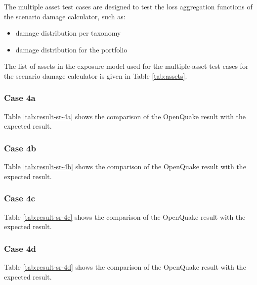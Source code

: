 The multiple asset test cases are designed to test the loss aggregation functions of the scenario damage calculator, such as:

\begin{itemize}
\item damage distribution per taxonomy
\item damage distribution for the portfolio
\end{itemize}

The list of assets in the exposure model used for the multiple-asset test cases for the scenario damage calculator is given in Table \ref{tab:assets}.



\subsubsection{Case 4a}


Table \ref{tab:result-sr-4a} shows the comparison of the OpenQuake result with the expected result.

\subsubsection{Case 4b}


Table \ref{tab:result-sr-4b} shows the comparison of the OpenQuake result with the expected result.
\subsubsection{Case 4c}


Table \ref{tab:result-sr-4c} shows the comparison of the OpenQuake result with the expected result.

\subsubsection{Case 4d}


Table \ref{tab:result-sr-4d} shows the comparison of the OpenQuake result with the expected result.
